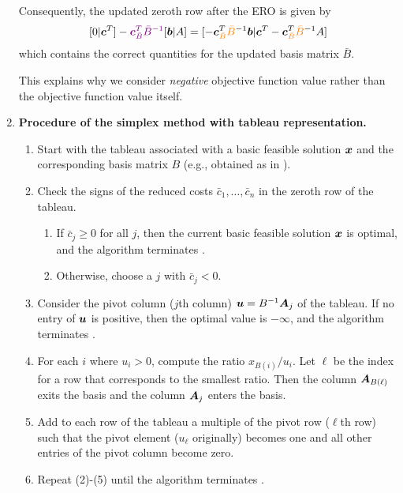 \begin{enumerate}
\begin{pf}
Consequently, the updated zeroth row after the ERO is given by
\[[0|\bm{c}^{T}]-{\color{violet}\bm{c}_{\bar{B}}^{T}\bar{B}^{-1}}[\bm{b}|A]
=[-\bm{c}_{{\color{orange}\bar{B}}}^{T}{\color{orange}\bar{B}}^{-1}\bm{b}|\bm{c}^{T}-\bm{c}_{{\color{orange}\bar{B}}}^{T}{\color{orange}\bar{B}}^{-1}A]\]
which contains the correct quantities for the updated basis matrix \(\bar{B}\).
\begin{note}
This explains why we consider \emph{negative} objective function value rather
than the objective function value itself.
\end{note}
\end{pf}
\item \label{it:tableau-algo} \textbf{Procedure of the simplex method with tableau representation.}
\begin{enumerate}[label={(\arabic*)}]
\item Start with the tableau associated with a basic feasible solution
\(\bm{x}\) and the corresponding basis matrix \(B\) (e.g., obtained as in
).
\item Check the signs of the reduced costs \(\bar{c}_1,\dotsc,\bar{c}_n\) in
the zeroth row of the tableau.
\begin{enumerate}
\item If \(\bar{c}_j\ge 0\) for all \(j\), then the current basic feasible
solution \(\bm{x}\) is optimal, and the algorithm terminates
.
\item Otherwise, choose a \(j\) with \(\bar{c}_j<0\).
\end{enumerate}
\item Consider the pivot column (\(j\)th column) \(\bm{u}=B^{-1}\bm{A}_j\)
of the tableau. If no entry of \(\bm{u}\) is positive, then the optimal value is
\(-\infty\), and the algorithm terminates .
\item For each \(i\) where \(u_i>0\), compute the ratio \(x_{B(i)}/u_i\). Let
\(\ell\) be the index for a row that corresponds to the smallest ratio. Then
the column \(\bm{A}_{B(\ell)}\) exits the basis and the column \(\bm{A}_j\)
enters the basis.
\item Add to each row of the tableau a multiple of the pivot row (\(\ell\)th
row) such that the pivot element (\(u_{\ell}\) originally) becomes one and all
other entries of the pivot column become zero.
\item Repeat (2)-(5) until the algorithm terminates .
\end{enumerate}

\end{enumerate}
